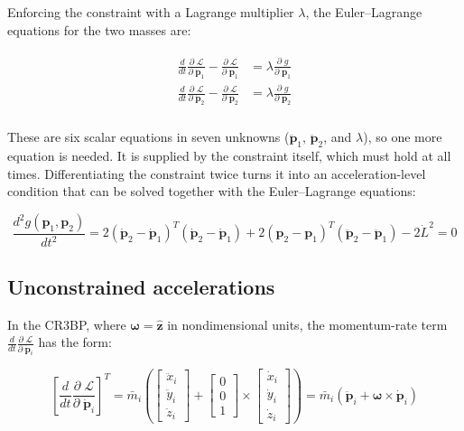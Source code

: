 \documentclass[]{article}
\newcommand{\pd}[2]{\frac{\partial\;#1}{\partial\;#2}}
\begin{document}
Enforcing the constraint with a Lagrange multiplier $\lambda$, the Euler--Lagrange equations for the two masses are:

\begin{align}
\begin{split}
    \frac{d}{dt} \pd{\mathcal{L}}{\dot{\mathbf{p}}_1} - \pd{\mathcal{L}}{\mathbf{p}_1} &= \lambda \pd{g}{\mathbf{p}_1} \\
    \frac{d}{dt} \pd{\mathcal{L}}{\dot{\mathbf{p}}_2} - \pd{\mathcal{L}}{\mathbf{p}_2} &= \lambda \pd{g}{\mathbf{p}_2} \\
\end{split}
\end{align}

These are six scalar equations in seven unknowns ($\ddot{\mathbf{p}}_1$, $\ddot{\mathbf{p}}_2$, and $\lambda$), so one more equation is needed.  It is supplied by the constraint itself, which must hold at all times.  Differentiating the constraint twice turns it into an acceleration-level condition that can be solved together with the Euler--Lagrange equations:

\begin{equation}
    \frac{d^2 g(\mathbf{p}_1, \mathbf{p}_2)}{dt^2} = 2 (\dot{\mathbf{p}}_2 - \dot{\mathbf{p}}_1)^T(\dot{\mathbf{p}}_2 - \dot{\mathbf{p}}_1) + 2 (\mathbf{p}_2 - \mathbf{p}_1)^T(\ddot{\mathbf{p}}_2 - \ddot{\mathbf{p}}_1) - 2 \dot{L}^2 = 0
\end{equation}

\subsection{Unconstrained accelerations}

In the CR3BP, where $\boldsymbol{\omega} = \hat{\mathbf{z}}$ in nondimensional units, the momentum-rate term $\frac{d}{dt} \pd{\mathcal{L}}{\dot{\mathbf{p}}_i}$ has the form:

\begin{equation}
    \left[ \frac{d}{dt} \pd{\mathcal{L}}{\dot{\mathbf{p}}_i} \right]^T = \bar{m}_i \left( \begin{bmatrix}
        \ddot{x}_i \\ \ddot{y}_i \\ \ddot{z}_i
    \end{bmatrix} + \begin{bmatrix}
        0 \\ 0 \\ 1
    \end{bmatrix} \times \begin{bmatrix}
        \dot{x}_i \\ \dot{y}_i \\ \dot{z}_i
    \end{bmatrix} \right) = \bar{m}_i \left( \ddot{\mathbf{p}}_i + \boldsymbol{\omega} \times \dot{\mathbf{p}}_i \right)
\end{equation}
\end{document}
